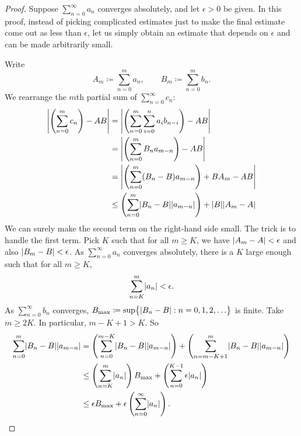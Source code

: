 \begin{proof}
Suppose $\sum_{n=0}^\infty a_n$ converges absolutely, and let $\epsilon > 0$ be
given.
In this proof, instead of picking complicated estimates just to make
the final estimate come out as less than $\epsilon$,
let us simply obtain an estimate that depends on $\epsilon$
and can be made arbitrarily small.

Write
\begin{equation*}
A_m \coloneqq \sum_{n=0}^m a_n , \qquad B_m \coloneqq \sum_{n=0}^m b_n .
\end{equation*}
We rearrange the $m$th partial sum of $\sum_{n=0}^\infty c_n$:
\begin{equation*}
\begin{split}
\left\lvert {\left(\sum_{n=0}^m c_n \right) - AB} \right\rvert
& =
\left\lvert {\left( \sum_{n=0}^m \sum_{i=0}^n a_i b_{n-i} \right) - AB} \right\rvert
\\
& =
\left\lvert {\left( \sum_{n=0}^m
  B_n a_{m-n} \right) - AB} \right\rvert
\\
& =
\left\lvert {\left( \sum_{n=0}^m
  ( B_n -  B ) a_{m-n} \right)
    + B A_m - AB} \right\rvert
\\
& \leq
\left(
\sum_{n=0}^m
  \lvert { B_n -  B } \rvert \lvert {a_{m-n}} \rvert
\right)
+
\lvert {B} \rvert\lvert {A_m - A} \rvert
\end{split}
\end{equation*}
We can surely make the second term on the right-hand side small.
The trick is to handle the first term.
Pick $K$ such that for all $m \geq K$, we have 
$\lvert {A_m - A} \rvert < \epsilon$ and
also
$\lvert {B_m - B} \rvert < \epsilon$.
As $\sum_{n=0}^\infty a_n$ converges absolutely,
there is a $K$ large enough such that
for all $m \geq K$,
\begin{equation*}
\sum_{n=K}^m \lvert {a_n} \rvert < \epsilon .
\end{equation*}
As $\sum_{n=0}^\infty b_n$ converges,
$B_{\text{max}} \coloneqq \sup \bigl\{ \lvert { B_n - B } \rvert : n = 0,1,2,\ldots
\bigr\}$
is finite.  Take $m \geq 2K$.
In particular, $m-K+1 > K$.  So
\begin{equation*}
\begin{split}
\sum_{n=0}^m
  \sabs{ B_n -  B } \sabs{a_{m-n}}
& =
\left(
\sum_{n=0}^{m-K}
  \sabs{ B_n -  B } \sabs{a_{m-n}}
\right)
+
\left(
\sum_{n=m-K+1}^m
  \sabs{ B_n -  B } \sabs{a_{m-n}}
\right)
\\
& \leq
\left(
\sum_{n=K}^m
\sabs{a_{n}}
\right)
B_{\text{max}}
+
\left(
\sum_{n=0}^{K-1}
  \epsilon \sabs{a_{n}}
\right)
\\
& \leq
\epsilon
B_{\text{max}}
+
\epsilon
\left(
\sum_{n=0}^\infty \sabs{a_{n}}
\right) .

\end{split}
\end{equation*}
\end{proof}
